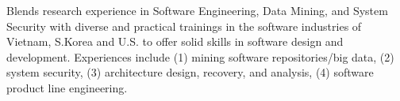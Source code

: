 


\begin{cvparagraph}
	
	Blends research experience in Software Engineering, Data Mining, and System Security with diverse and practical trainings in the software industries of Vietnam, S.Korea and U.S. to offer solid skills in software design and development. Experiences include (1) mining software repositories/big data, (2) system security, (3) architecture design, recovery, and analysis, (4) software product line engineering. %
	
\end{cvparagraph}
